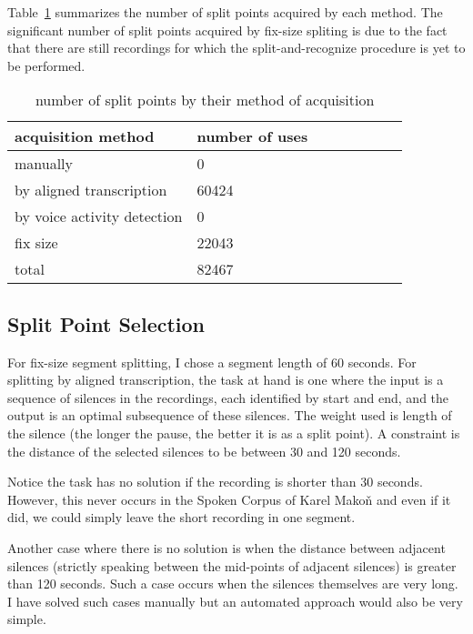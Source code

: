 \documentclass[conference]{IEEEtran}
\begin{document}
Table~\ref{tab:splitpoints} summarizes the number of split points acquired by
each method. The significant number of split points acquired by fix-size
spliting is due to the fact that there are still recordings for which the
split-and-recognize procedure is yet to be performed.

\begin{table}[htpb]
\begin{center}
\begin{tabular}{|l|l|l|l||l|l|l|l|}
\hline
acquisition method & number of uses \\
\hline
manually & 0 \\
by aligned transcription & 60424 \\
by voice activity detection & 0 \\
fix size & 22043 \\
total & 82467 \\
\hline
\end{tabular}
\caption{number of split points by their method of
acquisition}\label{tab:splitpoints}
\end{center}
\end{table}

\subsection{Split Point Selection}

For fix-size segment splitting, I chose a segment length of 60 seconds. For
splitting by aligned transcription, the task at hand is one where the input is a
sequence of silences in the recordings, each identified by start and end, and
the output is an optimal subsequence of these silences. The weight used is
length of the silence (the longer the pause, the better it is as a split point).
A constraint is the distance of the selected silences to be between 30 and 120
seconds.

Notice the task has no solution if the recording is shorter than 30 seconds.
However, this never occurs in the Spoken Corpus of Karel Makoň and even if it
did, we could simply leave the short recording in one segment.

Another case where there is no solution is when the distance between adjacent
silences (strictly speaking between the mid-points of adjacent silences) is
greater than 120 seconds. Such a case occurs when the silences themselves are
very long. I have solved such cases manually but an automated approach would
also be very simple.
\end{document}
